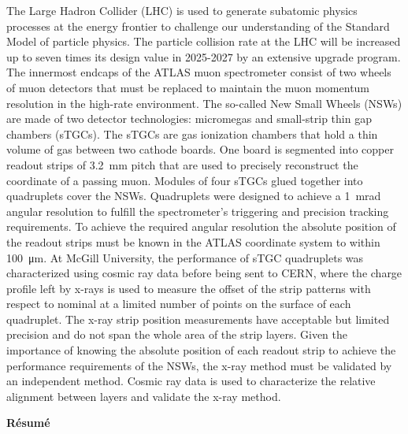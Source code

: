 The Large Hadron Collider (LHC) is used to generate subatomic physics processes at the energy frontier to challenge our understanding of the Standard Model of particle physics. The particle collision rate at the LHC will be increased up to seven times its design value in 2025-2027 by an extensive upgrade program. The innermost endcaps of the ATLAS muon spectrometer consist of two wheels of muon detectors that must be replaced to maintain the muon momentum resolution in the high-rate environment. The so-called New Small Wheels (NSWs) are made of two detector technologies: micromegas and small-strip thin gap chambers (sTGCs). The sTGCs are gas ionization chambers that hold a thin volume of gas between two cathode boards. One board is segmented into copper readout strips of \SI{3.2}{mm} pitch that are used to precisely reconstruct the coordinate of a passing muon. Modules of four sTGCs glued together into quadruplets cover the NSWs. Quadruplets were designed to achieve a \SI{1}{mrad} angular resolution to fulfill the spectrometer's triggering and precision tracking requirements. To achieve the required angular resolution the absolute position of the readout strips must be known in the ATLAS coordinate system to within \SI{100}{\micro\meter}. At McGill University, the performance of sTGC quadruplets was characterized using cosmic ray data before being sent to CERN, where the charge profile left by x-rays is used to measure the offset of the strip patterns with respect to nominal at a limited number of points on the surface of each quadruplet. The x-ray strip position measurements have acceptable but limited precision and do not span the whole area of the strip layers. Given the importance of knowing the absolute position of each readout strip to achieve the performance requirements of the NSWs, the x-ray method must be validated by an independent method. Cosmic ray data is used to characterize the relative alignment between layers and validate the x-ray method.

\cleardoublepage


\begin{center}\textbf{R\'{e}sum\'{e}}\end{center}

